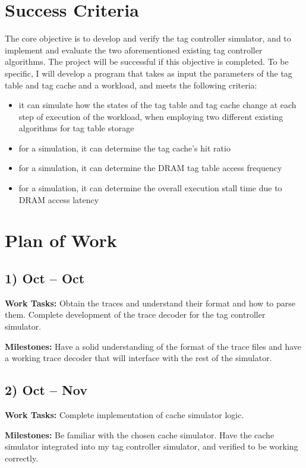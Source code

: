 \documentclass[10pt,a4paper]{article}
\begin{document}
\section*{Success Criteria}
The core objective is to develop and verify the tag controller simulator, and to implement and evaluate the two aforementioned existing tag controller algorithms. The project will be successful if this objective is completed. To be specific, I will develop a program that takes as input the parameters of the tag table and tag cache and a workload, and meets the following criteria:
\begin{itemize}
	\item it can simulate how the states of the tag table and tag cache change at each step of execution of the workload, when employing two different existing algorithms for tag table storage
	\item for a simulation, it can determine the tag cache's hit ratio
	\item for a simulation, it can determine the DRAM tag table access frequency
	\item for a simulation, it can determine the overall execution stall time due to DRAM access latency
\end{itemize}

\section*{Plan of Work}
\subsection*{1)  Oct --  Oct}
\textbf{Work Tasks:} Obtain the traces and understand their format and how to parse them. Complete development of the trace decoder for the tag controller simulator.

\textbf{Milestones:} Have a solid understanding of the format of the trace files and have a working trace decoder that will interface with the rest of the simulator.

\subsection*{2)  Oct --  Nov}
\textbf{Work Tasks:} Complete implementation of cache simulator logic.

\textbf{Milestones:} Be familiar with the chosen cache simulator. Have the cache simulator integrated into my tag controller simulator, and verified to be working correctly.
\end{document}
